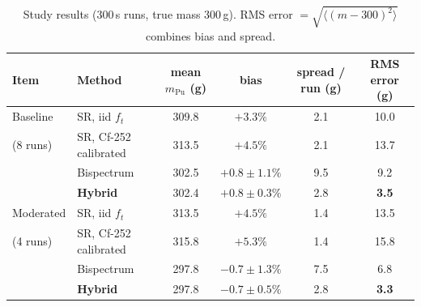 \documentclass[11pt,a4paper]{article}
\begin{document}
\begin{table}[h]
\centering\small
\begin{tabular}{@{}llcccc@{}}
\toprule
Item & Method & mean $m_{\text{Pu}}$ (g) & bias & spread / run (g) & RMS error (g) \\
\midrule
Baseline  & SR, iid $f_t$            & 309.8 & $+3.3\%$ & 2.1 & 10.0 \\
(8 runs)  & SR, Cf-252 calibrated    & 313.5 & $+4.5\%$ & 2.1 & 13.7 \\
          & Bispectrum               & 302.5 & $+0.8\pm1.1\%$ & 9.5 & 9.2 \\
          & \textbf{Hybrid}          & 302.4 & $+0.8\pm0.3\%$ & 2.8 & \textbf{3.5} \\
\midrule
Moderated & SR, iid $f_t$            & 313.5 & $+4.5\%$ & 1.4 & 13.5 \\
(4 runs)  & SR, Cf-252 calibrated    & 315.8 & $+5.3\%$ & 1.4 & 15.8 \\
          & Bispectrum               & 297.8 & $-0.7\pm1.3\%$ & 7.5 & 6.8 \\
          & \textbf{Hybrid}          & 297.8 & $-0.7\pm0.5\%$ & 2.8 & \textbf{3.3} \\
\bottomrule
\end{tabular}
\caption{Study results (300\,s runs, true mass 300\,g). RMS error $=\sqrt{\langle(m-300)^2\rangle}$ combines bias and spread.}
\label{tab:studies}
\end{table}
\end{document}
